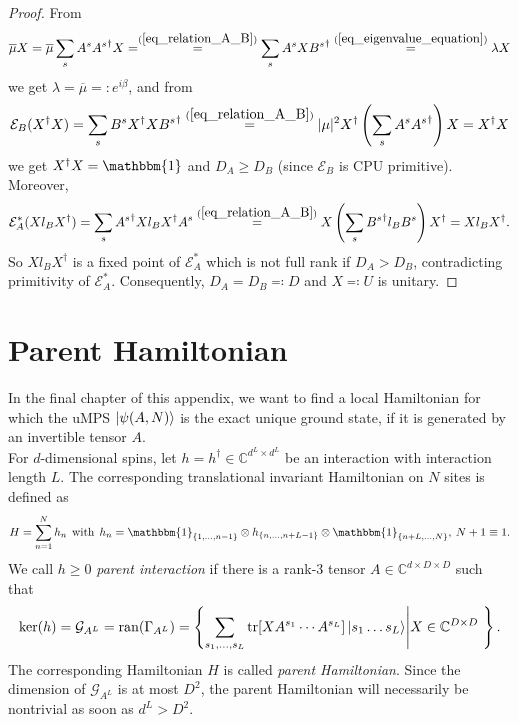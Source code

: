 \begin{proof}
From 
\begin{equation}
		\overline{\mu} X = \overline{\mu} \sum_s A^s {A^s}^{\dagger} X = \overset{(\ref{eq_relation_A_B})}{=} \sum_s A^s X {B^s}^{\dagger} \overset{(\ref{eq_eigenvalue_equation})}{=} \lambda X	
\end{equation}
we get $\lambda = \overline{\mu} =: e^{i\beta}$, and from
\begin{equation}
	\mathcal{E}_B(X^{\dagger} X) = \sum_s B^s X^{\dagger} X {B^s}^{\dagger} \overset{(\ref{eq_relation_A_B})}{=} \vert \mu \vert^2  X^{\dagger} \left(\sum_s A^s {A^s}^{\dagger} \right) X = X^{\dagger} X
\end{equation}
we get $X^{\dagger} X = \mathbbm{1}$ and $D_A \geq D_B$ (since $\mathcal{E}_B$ is CPU primitive). Moreover, 
\begin{equation}
	\mathcal{E}_A^* (X l_B X^{\dagger}) = \sum_s {A^s}^{\dagger} X l_B X^{\dagger} A^s \overset{(\ref{eq_relation_A_B})}{=} X \left( \sum_s {B^s}^{\dagger} l_B B^s \right) X^{\dagger} = X l_B X^{\dagger}.
\end{equation}
So $X l_B X^{\dagger}$ is a fixed point of $\mathcal{E}_A^*$ which is not full rank if $D_A > D_B$, contradicting primitivity of $\mathcal{E}_A^*$. Consequently, $D_A = D_B \eqqcolon D$ and $X \eqqcolon U$ is unitary.
\end{proof}


\section*{Parent Hamiltonian}
\noindent In the final chapter of this appendix, we want to find a local Hamiltonian for which the uMPS $\ket{\psi(A, N)}$ is the exact unique ground state, if it is generated by an invertible tensor $A$. \\

\noindent For $d$-dimensional spins, let $h = h^{\dagger} \in \mathbb{C}^{d^L \times d^L}$ be an interaction with interaction length $L$. The corresponding translational invariant Hamiltonian on $N$ sites is defined as 
\begin{equation}
	H = \sum_{n=1}^N h_n \:\:\mathrm{with}\:\: h_n = \mathbbm{1}_{\{1, \ldots, n-1\}} \otimes h_{\{n, \ldots, n+L-1\}} \otimes \mathbbm{1}_{\{n+L, \ldots, N\}}, \: N+1 \equiv  1.
\end{equation}
We call $h \geq 0$ \textit{parent interaction} if there is a rank-3 tensor $A \in \mathbb{C}^{d \times D \times D}$ such that 
\begin{equation}
	\mathrm{ker}(h) = \mathcal{G}_{A^L} = \mathrm{ran}(\Gamma_{A^L}) = \left\{ \sum\limits_{s_1, \ldots, s_L}\mathrm{tr}[X A^{s_1} \cdots A^{s_L}]\ket{s_1 \ldots s_L} \middle\vert X \in \mathbb{C}^{D \times D} \right\}.
\end{equation}
The corresponding Hamiltonian $H$ is called \textit{parent Hamiltonian}. Since the dimension of $\mathcal{G}_{A^L}$ is at most $D^2$, the parent Hamiltonian will necessarily be nontrivial as soon as $d^L > D^2$. \cite{cirac2021matrix}

